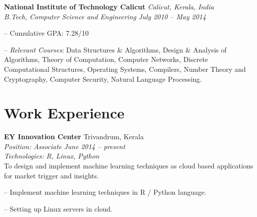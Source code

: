 \documentclass[margin,line]{resume}
\begin{document}
\begin{resume}
    \textbf{National Institute of Technology Calicut} \hfill \textit{Calicut, Kerala, India} \vspace{1mm}\\\vspace{1mm}%
    \textsl{B.Tech, Computer Science and Engineering} \hfill \textit{ July 2010 -- May 2014}\vspace{-3mm}\\\vspace{-1mm}%
    \begin{list2}
        \item[--] Cumulative GPA: 7.28/10 
        \item[--] \textit{Relevant Courses}: Data Structures \& Algorithms, Design \& Analysis of Algorithms, Theory
of Computation, Computer Networks, Discrete Computational Structures, Operating Systems, 
Compilers, Number Theory and Cryptography, Computer Security, Natural Language Processing.
    \end{list2}\vspace{-1.5mm}
    
 \vspace{3mm}


    \section{\mysidestyle Work Experience}


    \textbf{EY Innovation Center } 				\hfill  Trivandrum, Kerala \\
      \textit{Position: Associate } 			\hfill \textit{June 2014 -- present}\\
      \textit{Technologies: R, Linux, Python }\\
	 To design and implement machine learning techniques as cloud based applications for market trigger and insights. 
	 	\begin{list2}
	\item[--] Implement machine learning techniques in R / Python language.
	\item[--] Setting up Linux servers in cloud.
	\end{list2}

	 
 \vspace{3mm}



\end{resume}
\end{document}
